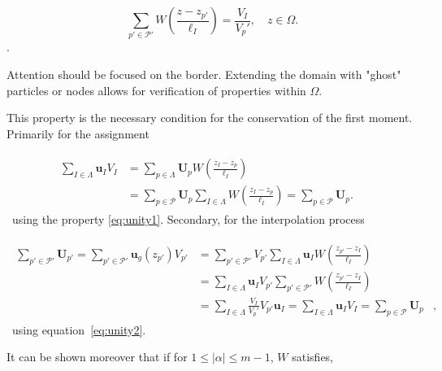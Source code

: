 \begin{equation}~\label{eq:unity2}
    \sum_{p'\in\mathcal P'} W\left(\frac{z - z_{p'}}{\ell_I}\right) = \frac{V_I}{V_p'},\quad z \in \Omega.
\end{equation}.

Attention should be focused on the border. Extending the domain with "ghost" particles or nodes allows for verification of properties within $\Omega$.

This property is the necessary condition for the conservation of the first moment. Primarily for the assignment

\begin{gather}
    \begin{align*}
        \sum_{I \in \Lambda} \bm u_I V_I & = \sum_{p \in \Lambda} \bm U_p  W \left(\frac{z_I - z_p}{\ell_I} \right)                                                           & \\
                                         & = \sum_{p \in \mathcal P} \bm U_p \sum_{I \in \Lambda} W \left(\frac{z_I - z_p}{\ell_I} \right) = \sum_{p \in \mathcal P} \bm U_p. &
    \end{align*}
\end{gather}~using the property \eqref{eq:unity1}. Secondary, for the interpolation process

\begin{gather}
    \begin{align*}
        \sum_{p' \in \mathcal P'} \bm U_{p'} = \sum_{p' \in \mathcal P'} \bm u_g(z_{p'}) V_{p'} & = \sum_{p' \in \mathcal P'} V_{p'} \sum_{I \in \Lambda} \bm u_I W \left(\frac{z_{p'} - z_I}{\ell_I}\right)                                                &   \\
                                                                                                & =  \sum_{I \in \Lambda} \bm u_I  V_{p'}\sum_{p' \in \mathcal P'} W \left(\frac{z_{p'} - z_I}{\ell_I}\right)                                               &   \\
                                                                                                & =  \sum_{I \in \Lambda} \frac{V_I}{V_p'} V_{p'} \bm u_I =                            \sum_{I \in \Lambda} \bm u_I V_{I} = \sum_{p \in \mathcal P} \bm U_p & ,
    \end{align*}
\end{gather}~using equation~\eqref{eq:unity2}.

It can be shown moreover that if for $1 \leq |\alpha| \leq m - 1$, $W$ satisfies,

